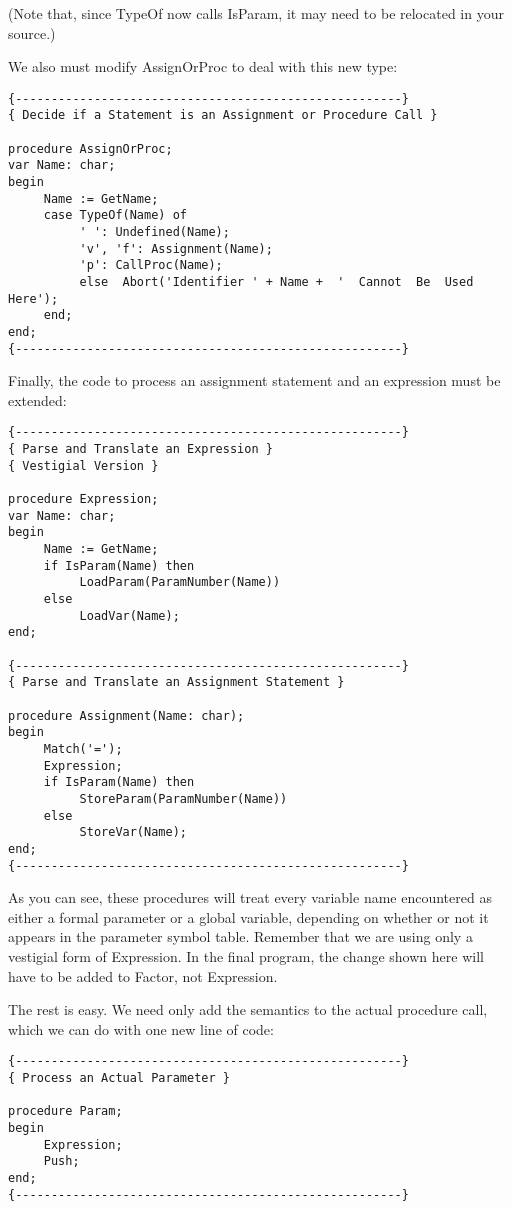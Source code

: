(Note that, since  TypeOf  now  calls  IsParam, it may need to be relocated in your source.)

We also must modify AssignOrProc to deal with this new type:

\begin{verbatim}
{------------------------------------------------------}
{ Decide if a Statement is an Assignment or Procedure Call }

procedure AssignOrProc;
var Name: char;
begin
     Name := GetName;
     case TypeOf(Name) of
          ' ': Undefined(Name);
          'v', 'f': Assignment(Name);
          'p': CallProc(Name);
          else  Abort('Identifier ' + Name +  '  Cannot  Be  Used
Here');
     end;
end;
{------------------------------------------------------}
\end{verbatim}

Finally, the  code  to process an assignment  statement  and  an expression must be extended:

\begin{verbatim}
{------------------------------------------------------}
{ Parse and Translate an Expression }
{ Vestigial Version }

procedure Expression;
var Name: char;
begin
     Name := GetName;
     if IsParam(Name) then
          LoadParam(ParamNumber(Name))
     else
          LoadVar(Name);
end;

{------------------------------------------------------}
{ Parse and Translate an Assignment Statement }

procedure Assignment(Name: char);
begin
     Match('=');
     Expression;
     if IsParam(Name) then
          StoreParam(ParamNumber(Name))
     else
          StoreVar(Name);
end;
{------------------------------------------------------}
\end{verbatim}

As you can see, these procedures will treat  every  variable name encountered as either a  formal  parameter  or a global variable, depending  on  whether  or not it appears in the parameter symbol table. Remember  that  we  are  using  only a vestigial form of Expression. In the  final  program, the  change shown here will have to be added to Factor, not Expression.

The rest is easy. We need only add the  semantics  to the actual procedure call, which we can do with one new line of code:

\begin{verbatim}
{------------------------------------------------------}
{ Process an Actual Parameter }

procedure Param;
begin
     Expression;
     Push;
end;
{------------------------------------------------------}
\end{verbatim}

